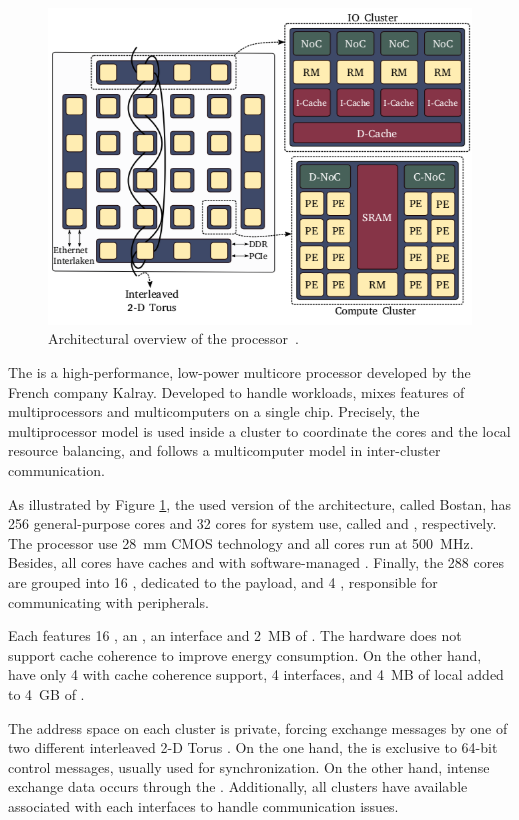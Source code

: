 		\begin{figure}[h]
			\centering
			\includegraphics[width=.7\textwidth]{images/arch-mppa.png}

			\caption{
				Architectural overview of the \mppa processor~\cite{Penna2018}.
			}\par
			\label{fig.mppa-arch}
		\end{figure}

		The \mppa is a high-performance, low-power multicore processor
		developed by the French company Kalray.
		Developed to handle \mimd workloads, \mppa mixes features of
		multiprocessors and multicomputers on a single chip.
		Precisely, the multiprocessor model is used inside a cluster
		to coordinate the cores and the local resource balancing, and
		follows a multicomputer model in inter-cluster communication.

		As illustrated by Figure \ref{fig.mppa-arch}, the used version of
		the architecture, called Bostan, has 256 general-purpose cores and
		32 cores for system use, called \pes and \rmans, respectively.
		The processor use 28~mm CMOS technology and all cores run at 500~MHz.
		Besides, all cores have caches and \mmus with software-managed \tlbs.
		Finally, the 288 cores are grouped into 16 \cclusters, dedicated to
		the payload, and 4 \ioclusters, responsible for communicating with peripherals.

		Each \ccluster features 16 \pes, an \rman, an \noc interface and 2~MB of \sram.
		The hardware does not support cache coherence to improve energy consumption.
		On the other hand, \ioclusters have only 4 \rmans with cache coherence support,
		4 \noc interfaces, and 4~MB of local \sram added to 4~GB of \dram.

		The address space on each cluster is private, forcing exchange messages
		by one of two different interleaved 2-D Torus \nocs.
		On the one hand, the \cnoc is exclusive to 64-bit control messages,
		usually used for synchronization.
		On the other hand, intense exchange data occurs through the \dnoc.
		Additionally, all clusters have available \dmas associated with each
		\noc interfaces to handle communication issues.

